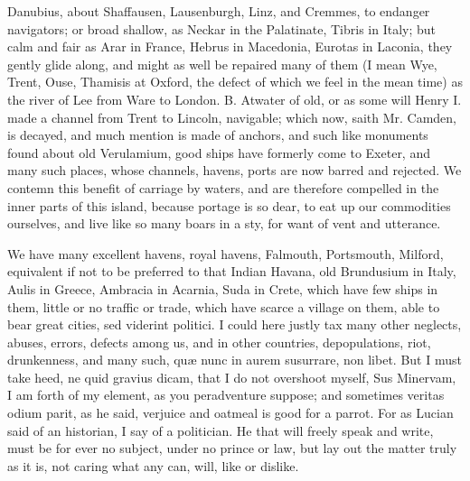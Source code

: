 {Danubius, about Shaffausen, Lausenburgh, Linz, and Cremmes, to endanger
navigators; or broad shallow, as Neckar in the Palatinate, Tibris in
Italy; but calm and fair as Arar in France, Hebrus in Macedonia,
Eurotas in Laconia, they gently glide along, and might as well be
repaired many of them (I mean Wye, Trent, Ouse, Thamisis at Oxford, the
defect of which we feel in the mean time) as the river of Lee from Ware
to London. B. Atwater of old, or as some will Henry I. made a
channel from Trent to Lincoln, navigable; which now, saith Mr. Camden,
is decayed, and much mention is made of anchors, and such like
monuments found about old Verulamium, good ships have formerly
come to Exeter, and many such places, whose channels, havens, ports are
now barred and rejected. We contemn this benefit of carriage by waters,
and are therefore compelled in the inner parts of this island, because
portage is so dear, to eat up our commodities ourselves, and live like
so many boars in a sty, for want of vent and utterance.

We have many excellent havens, royal havens, Falmouth, Portsmouth,
Milford, \etc{} equivalent if not to be preferred to that Indian Havana,
old Brundusium in Italy, Aulis in Greece, Ambracia in Acarnia, Suda in
Crete, which have few ships in them, little or no traffic or trade,
which have scarce a village on them, able to bear great cities, sed
viderint politici. I could here justly tax many other neglects, abuses,
errors, defects among us, and in other countries, depopulations, riot,
drunkenness, \etc{} and many such, qu\ae{} nunc in aurem susurrare, non
libet. But I must take heed, ne quid gravius dicam, that I do not
overshoot myself, Sus Minervam, I am forth of my element, as you
peradventure suppose; and sometimes veritas odium parit, as he said,
verjuice and oatmeal is good for a parrot. For as Lucian said of an
historian, I say of a politician. He that will freely speak and write,
must be for ever no subject, under no prince or law, but lay out the
matter truly as it is, not caring what any can, will, like or dislike.

}
